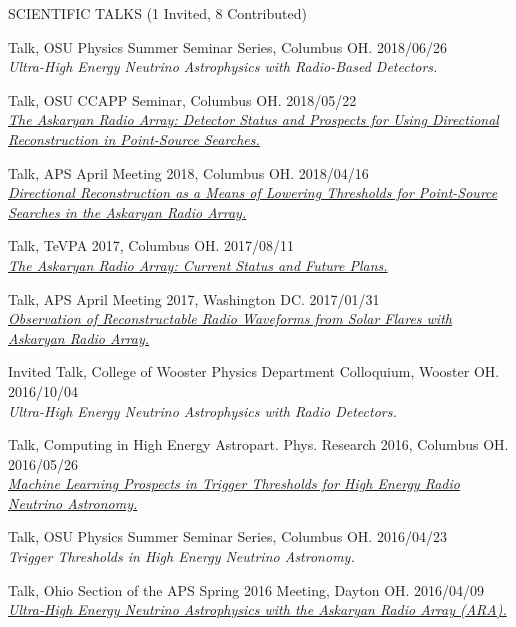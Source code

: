 \documentclass{resume} %
\begin{document}
\begin{rSection}{SCIENTIFIC TALKS (1 Invited, 8 Contributed)}
\begin{etaremune}

\item Talk, OSU Physics Summer Seminar Series, Columbus OH. \hfill 2018/06/26 \\
{\em Ultra-High Energy Neutrino Astrophysics with Radio-Based Detectors.} 

\item Talk, OSU CCAPP Seminar, Columbus OH. \hfill 2018/05/22 \\
\href{http://ccapp.osu.edu/pastseminars.html#past}{\textit{The Askaryan Radio Array: Detector Status and Prospects for Using Directional Reconstruction in Point-Source Searches.}}

\item Talk, APS April Meeting 2018, Columbus OH. \hfill 2018/04/16 \\
\href{http://meetings.aps.org/Meeting/APR18/Session/U17.7}{{\em Directional Reconstruction as a Means of Lowering Thresholds for Point-Source Searches in the Askaryan Radio Array.}}

\item Talk, TeVPA 2017, Columbus OH. \hfill 2017/08/11 \\
\href{http://indico.cern.ch/event/615891/contributions/2648790/}{{\em The Askaryan Radio Array: Current Status and Future Plans.} }

\item Talk, APS April Meeting 2017, Washington DC. \hfill 2017/01/31 \\
\href{http://meetings.aps.org/Meeting/APR17/Session/Y3.2}{{\em Observation of Reconstructable Radio Waveforms from Solar Flares with Askaryan Radio Array.}}

\item Invited Talk, College of Wooster Physics Department Colloquium, Wooster OH. \hfill 2016/10/04 \\
{\em Ultra-High Energy Neutrino Astrophysics with Radio Detectors.}

\item Talk, Computing in High Energy Astropart. Phys. Research 2016, Columbus OH. \hfill 2016/05/26 \\
\href{http://ccapp.osu.edu/workshops/CHEAPR2016/workshop.html}{\em Machine Learning Prospects in Trigger Thresholds for High Energy Radio Neutrino Astronomy.}

\item Talk, OSU Physics Summer Seminar Series, Columbus OH. \hfill 2016/04/23 \\
{\em Trigger Thresholds in High Energy Neutrino Astronomy.} 

\item Talk, Ohio Section of the APS Spring 2016 Meeting, Dayton OH. \hfill 2016/04/09 \\
\href{http://meetings.aps.org/Meeting/OSS16/Session/D3.6}{\em Ultra-High Energy Neutrino Astrophysics with the Askaryan Radio Array (ARA).} 
 \end{etaremune}
\end{rSection}
\vspace{-0.10cm}
\end{document}
